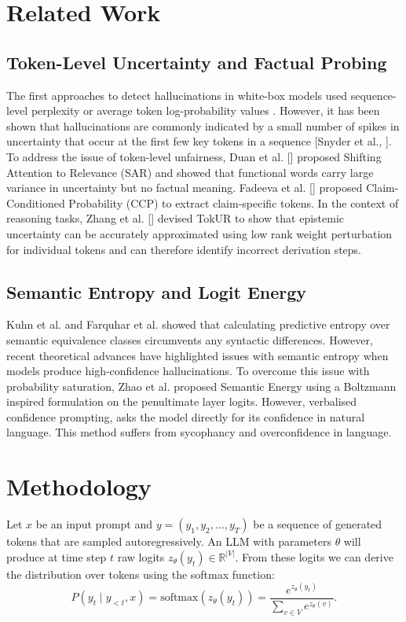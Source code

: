 \documentclass[10pt,twocolumn]{article}
\begin{document}
\section{Related Work}
\subsection{Token-Level Uncertainty and Factual Probing}
The first approaches to detect hallucinations in white-box models used sequence-level perplexity or average token log-probability values \cite{eliseev2024detecting}. However, it has been shown that hallucinations are commonly indicated by a small number of spikes in uncertainty that occur at the first few key tokens in a sequence [Snyder et al., \cite{snyder2024early}]. To address the issue of token-level unfairness, Duan et al. [\cite{duan2024shifting}] proposed Shifting Attention to Relevance (SAR) and showed that functional words carry large variance in uncertainty but no factual meaning. Fadeeva et al. [\cite{fadeeva2024fact}] proposed Claim-Conditioned Probability (CCP) to extract claim-specific tokens. In the context of reasoning tasks, Zhang et al. [\cite{zhang2025tokur}] devised TokUR to show that epistemic uncertainty can be accurately approximated using low rank weight perturbation for individual tokens and can therefore identify incorrect derivation steps.

\subsection{Semantic Entropy and Logit Energy}
Kuhn et al.\cite{kuhn2023semantic} and Farquhar et al.\cite{farquhar2024detecting} showed that calculating predictive entropy over semantic equivalence classes circumvents any syntactic differences. However, recent theoretical advances have highlighted issues with semantic entropy when models produce high-confidence hallucinations.\cite{zhao2024semantic} To overcome this issue with probability saturation, Zhao et al.\cite{zhao2024semantic} proposed Semantic Energy using a Boltzmann inspired formulation on the penultimate layer logits. However, verbalised confidence prompting,\cite{lin2022teaching} asks the model directly for its confidence in natural language. This method suffers from sycophancy and overconfidence in language.

\section{Methodology}
Let $ x $ be an input prompt and $ y = (y_1, y_2, ..., y_T) $ be a sequence of generated tokens that are sampled autoregressively. An LLM with parameters $ \theta $ will produce at time step $ t $ raw logits $ z_{\theta}(y_t) \in \mathbb{R}^{|V|} $. From these logits we can derive the distribution over tokens using the softmax function:
\begin{equation}
P(y_t \mid y_{<t}, x) = \text{softmax}(z_\theta(y_t)) = \frac{e^{z_\theta(y_t)}}{\sum_{v \in V} e^{z_\theta(v)}}.
\end{equation}
\end{document}
